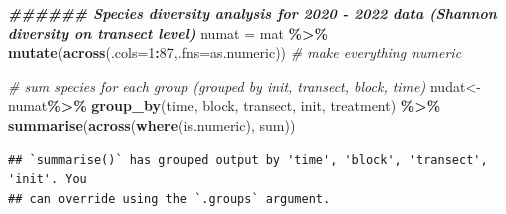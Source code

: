 \documentclass[
]{article}
\newenvironment{Shaded}{\begin{snugshade}}{\end{snugshade}}
\newcommand{\AttributeTok}[1]{\textcolor[rgb]{0.13,0.29,0.53}{#1}}
\newcommand{\CommentTok}[1]{\textcolor[rgb]{0.56,0.35,0.01}{\textit{#1}}}
\newcommand{\DecValTok}[1]{\textcolor[rgb]{0.00,0.00,0.81}{#1}}
\newcommand{\DocumentationTok}[1]{\textcolor[rgb]{0.56,0.35,0.01}{\textbf{\textit{#1}}}}
\newcommand{\FunctionTok}[1]{\textcolor[rgb]{0.13,0.29,0.53}{\textbf{#1}}}
\newcommand{\NormalTok}[1]{#1}
\newcommand{\OtherTok}[1]{\textcolor[rgb]{0.56,0.35,0.01}{#1}}
\newcommand{\SpecialCharTok}[1]{\textcolor[rgb]{0.81,0.36,0.00}{\textbf{#1}}}
\begin{document}
\begin{Shaded}
\begin{Highlighting}[]
\DocumentationTok{\#\#\#\#\#\# Species diversity analysis for 2020 {-} 2022 data (Shannon diversity on transect level) }
\NormalTok{numat }\OtherTok{=}\NormalTok{ mat }\SpecialCharTok{\%\textgreater{}\%} \FunctionTok{mutate}\NormalTok{(}\FunctionTok{across}\NormalTok{(}\AttributeTok{.cols=}\DecValTok{1}\SpecialCharTok{:}\DecValTok{87}\NormalTok{,}\AttributeTok{.fns=}\NormalTok{as.numeric)) }\CommentTok{\# make everything numeric}

\CommentTok{\# sum species for each group (grouped by init, transect, block, time)}
\NormalTok{nudat}\OtherTok{\textless{}{-}}\NormalTok{numat}\SpecialCharTok{\%\textgreater{}\%} 
  \FunctionTok{group\_by}\NormalTok{(time, block, transect, init, treatment) }\SpecialCharTok{\%\textgreater{}\%} \FunctionTok{summarise}\NormalTok{(}\FunctionTok{across}\NormalTok{(}\FunctionTok{where}\NormalTok{(is.numeric), sum))}
\end{Highlighting}
\end{Shaded}

\begin{verbatim}
## `summarise()` has grouped output by 'time', 'block', 'transect', 'init'. You
## can override using the `.groups` argument.
\end{verbatim}
\end{document}
